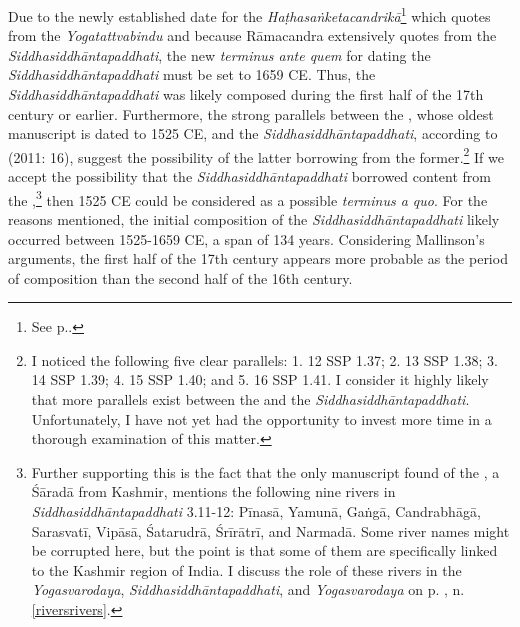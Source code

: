 Due to the newly established date for the \textit{Haṭhasaṅketacandrikā}\footnote{See p.\pageref{dating}.} which quotes from the \emph{Yogatattvabindu} and because Rāmacandra extensively quotes from the \textit{Siddhasiddhāntapaddhati}, the new \textit{terminus ante quem} for dating the \textit{Siddhasiddhāntapaddhati} must be set to 1659 CE. Thus, the \textit{Siddhasiddhāntapaddhati} was likely composed during the first half of the 17th century or earlier. Furthermore, the strong parallels between the , whose oldest manuscript is dated to 1525 CE, and the \textit{Siddhasiddhāntapaddhati}, according to \citeauthor{mallinsonnath} (2011: 16), suggest the possibility of the latter borrowing from the former.\footnote{I noticed the following five clear parallels: 1.  12 \approx SSP 1.37; 2.  13 \approx SSP 1.38; 3.  14 \approx SSP 1.39; 4.  15 \approx SSP 1.40; and 5.  16 \approx SSP 1.41. I consider it highly likely that more parallels exist between the  and the \textit{Siddhasiddhāntapaddhati}. Unfortunately, I have not yet had the opportunity to invest more time in a thorough examination of this matter.} If we accept the possibility that the \textit{Siddhasiddhāntapaddhati} borrowed content from the ,\footnote{Further supporting this is the fact that the only manuscript found of the , a Śāradā from Kashmir, mentions the following nine rivers in \textit{Siddhasiddhāntapaddhati} 3.11-12: Pīnasā, Yamunā, Gaṅgā, Candrabhāgā, Sarasvatī, Vipāsā, Śatarudrā, Śrīrātrī, and Narmadā. Some river names might be corrupted here, but the point is that some of them are specifically linked to the Kashmir region of India. I discuss the role of these rivers in the \emph{Yogasvarodaya}, \emph{Siddhasiddhāntapaddhati}, and \emph{Yogasvarodaya} on p. \pageref{riversrivers}, n. \ref{riversrivers}.} then 1525 CE could be considered as a possible \textit{terminus a quo}. For the reasons mentioned, the initial composition of the \textit{Siddhasiddhāntapaddhati} likely occurred between 1525-1659 CE, a span of 134 years. Considering Mallinson's arguments, the first half of the 17th century appears more probable as the period of composition than the second half of the 16th century.

